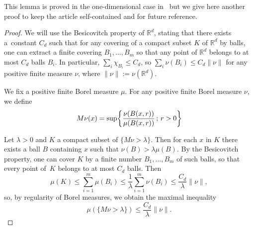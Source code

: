 \documentclass[10pt]{amsart}
\theoremstyle{definition}\newtheorem{defi}[theo]{Definition}\newtheorem{rema}[theo]{Remark}\newtheorem{exam}[theo]{Example}\newtheorem{exem}[theo]{Example}\newtheorem{nota}[theo]{Notation}
\newcommand{\R}{\mathbb{R}}
\newcounter{setofcase}
\newcounter{case}[setofcase]
\let\originalleft\left
\let\originalright\right
\renewcommand{\left}{\mathopen{}\mathclose\bgroup\originalleft}
\renewcommand{\right}{\aftergroup\egroup\originalright}
\begin{document}
This lemma is proved in the one-dimensional case in~\cite[Proposition~2.1]{BOS} but we give here another proof to keep the article self-contained and for future reference.


\begin{proof}
We will use the Besicovitch property of $\R^d$, stating that there exists a~constant $C_d$ such that for any covering of a compact subset $K$ of $\R^d$ by balls, one can extract a finite covering $B_1,\dots,B_m$ so that any point of $\R^d$ belongs to at most $C_d$ balls $B_i$. In particular, $\sum_i \chi_{B_i}\leq C_d$, so $\sum_i \nu(B_i)\leq C_d\|\nu\|$ for any positive finite measure $\nu$, where $\|\nu\|:=\nu(\R^d)$.

We fix a positive finite Borel measure $\mu$. For any positive finite Borel measure $\nu$, we define
\[
M\nu(x)=\sup \left\{\frac{\nu(B(x,r))}{\mu(B(x,r))}\,;\, r>0\right\}
\]

Let $\lambda>0$ and $K$ a compact subset of $\{M\nu>\lambda\}$. Then for each $x$ in $K$ there exists a ball $B$ containing $x$ such that $\nu(B)> \lambda \mu(B)$. By the Besicovitch property, one can cover $K$ by a finite number $B_1,\dots, B_m$ of such balls, so that every point of~$K$ belongs to at most $C_d$ balls. Then
\[
\mu(K)\leq \sum_{i=1}^m \mu(B_i)\leq \frac{1}{\lambda} \sum_{i=1}^m \nu(B_i)\leq \frac{C_d}{\lambda}\|\nu\|,
\]
so, by regularity of Borel measures, we obtain the maximal inequality
\begin{equation}\label{max}
\mu(\{M\nu>\lambda\})\leq \frac{C_d}{\lambda}\|\nu\|.
\end{equation}


\end{proof}
\end{document}
